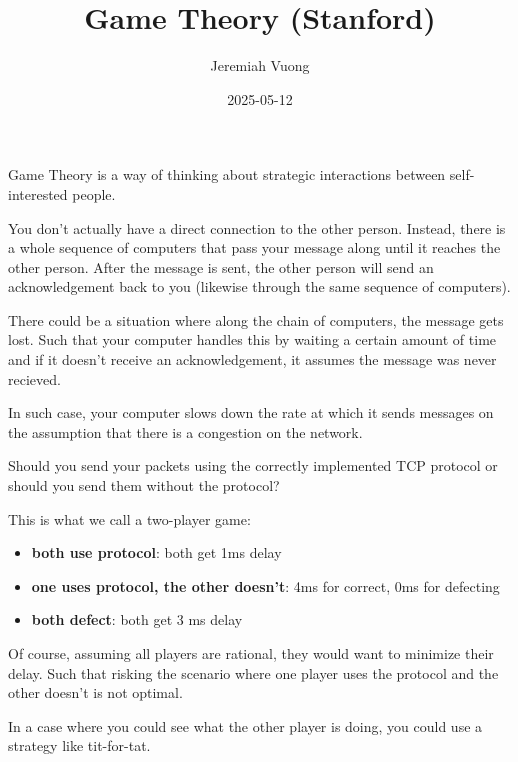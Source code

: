 \documentclass{article}
\title{Game Theory (Stanford)}
\author{Jeremiah Vuong}
\date{2025-05-12}
\begin{document}

\maketitle

\tableofcontents
\newpage

Game Theory is a way of thinking about strategic interactions between self-interested people.
\begin{definition}
  You don't actually have a direct connection to the other person.
  Instead, there is a whole sequence of computers that pass your message along until it reaches the other person.
  After the message is sent, the other person will send an acknowledgement back to you (likewise through the same sequence of computers).

  There could be a situation where along the chain of computers, the message gets lost.
  Such that your computer handles this by waiting a certain amount of time and if it doesn't receive an acknowledgement,
  it assumes the message was never recieved.

  In such case, your computer slows down the rate at which it sends messages on the assumption that
  there is a congestion on the network.
\end{definition}

\begin{example}
  Should you send your packets using the correctly implemented TCP protocol or should you send them without the protocol?

  This is what we call a two-player game:
  \begin{itemize}
    \item \textbf{both use protocol}: both get 1ms delay
    \item \textbf{one uses protocol, the other doesn't}: 4ms for correct, 0ms for defecting
    \item \textbf{both defect}: both get 3 ms delay
  \end{itemize}
\end{example}

Of course, assuming all players are rational, they would want to minimize their delay.
Such that risking the scenario where one player uses the protocol and the other doesn't is not optimal.

In a case where you could see what the other player is doing, you could use a strategy like tit-for-tat.
\end{document}
